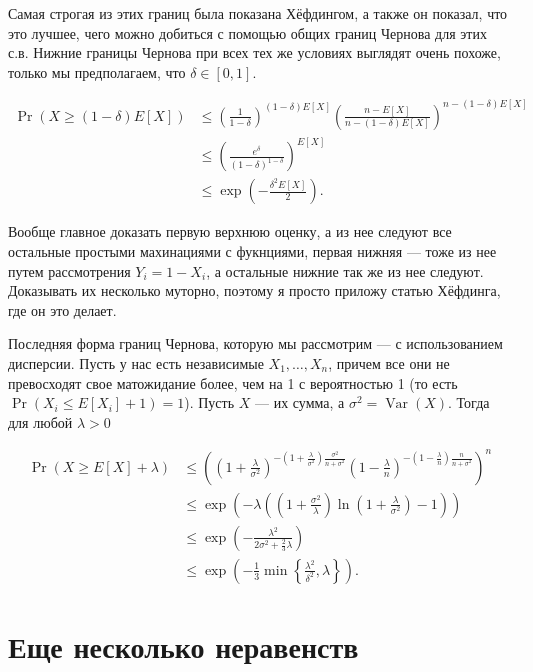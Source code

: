 \documentclass[12pt]{article}
\DeclareMathOperator{\Var}{Var}
\begin{document}
Самая строгая из этих границ была показана Хёфдингом, а также он показал, что это лучшее, чего можно добиться с помощью общих границ Чернова для этих с.в. Нижние границы Чернова при всех тех же условиях выглядят очень похоже, только мы предполагаем, что $\delta \in [0, 1]$.

\begin{align*}
  \Pr(X \ge (1 - \delta)E[X]) &\le \left(\frac{1}{1 - \delta}\right)^{(1 - \delta)E[X]} \left(\frac{n - E[X]}{n - (1 - \delta)E[X]}\right)^{n - (1 - \delta)E[X]} \\
  &\le \left(\frac{e^\delta}{(1 - \delta)^{1 - \delta}}\right)^{E[X]} \\
  &\le \exp\left(-\frac{\delta^2E[X]}{2}\right).
\end{align*}

Вообще главное доказать первую верхнюю оценку, а из нее следуют все остальные простыми махинациями с фукнциями, первая нижняя --- тоже из нее путем рассмотрения $Y_i = 1 - X_i$, а остальные нижние так же из нее следуют. Доказывать их несколько муторно, поэтому я просто приложу статью Хёфдинга, где он это делает.

Последняя форма границ Чернова, которую мы рассмотрим --- с использованием дисперсии. Пусть у нас есть независимые $X_1, \dots, X_n$, причем все они не превосходят свое матожидание более, чем на 1 с вероятностью 1 (то есть $\Pr(X_i \le E[X_i] + 1) = 1$). Пусть $X$ --- их сумма, а $\sigma^2 = \Var(X)$. Тогда для любой $\lambda > 0$

\begin{align*}
  \Pr(X \ge E[X] + \lambda) &\le \left(\left(1 + \frac{\lambda}{\sigma^2}\right)^{-(1 + \frac{\lambda}{\sigma^2})\frac{\sigma^2}{n + \sigma^2}} \left(1 - \frac{\lambda}{n}\right)^{-(1 - \frac{\lambda}{n})\frac{n}{n + \sigma^2}} \right)^n \\
  &\le \exp\left(-\lambda\left(\left(1 + \frac{\sigma^2}{\lambda}\right)\ln\left(1 + \frac{\lambda}{\sigma^2}\right) - 1\right)\right) \\
  &\le \exp\left(-\frac{\lambda^2}{2\sigma^2 + \frac{2}{3}\lambda}\right) \\
  &\le \exp\left(-\frac{1}{3} \min\left\{ \frac{\lambda^2}{\delta^2}, \lambda\right\}\right).
\end{align*}

\section{Еще несколько неравенств}
\end{document}
